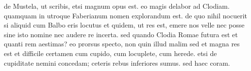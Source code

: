 


 de Mustela, ut scribis, etsi magnum opus est. eo magis delabor ad Clodiam. quamquam in utroque Faberianum nomen explorandum est. de quo nihil nocuerit si aliquid cum Balbo eris locutus et quidem, ut res est, emere nos velle nec posse sine isto nomine nec audere re incerta. sed quando Clodia Romae futura est et quanti rem aestimas? eo prorsus specto, non quin illud malim sed et magna res est et difficile certamen cum cupido, cum locuplete, cum herede. etsi de cupiditate nemini concedam; ceteris rebus inferiores sumus. sed haec coram.
